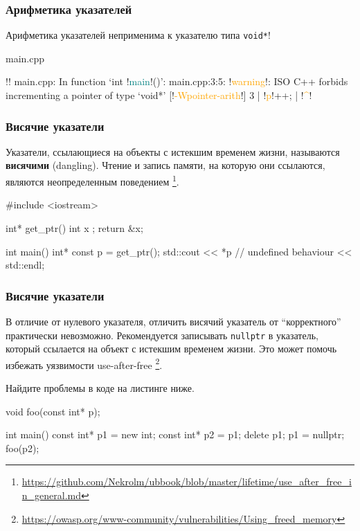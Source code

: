 \documentclass[compress, 8pt, aspectratio=169]{beamer}
\begin{document}
\begin{frame}[fragile]

    \frametitle{Арифметика указателей}

    Арифметика указателей неприменима к указателю типа \verb|void*|!

        {main.cpp}

    \begin{terminalwindow}
!!
main.cpp: In function ‘int !\textcolor{teal}{main}!()’:
main.cpp:3:5: !\textcolor{orange}{warning}!: ISO C++ forbids incrementing a pointer of type ‘void*’ [!\textcolor{orange}{-Wpointer-arith}!]
    3 |     !\textcolor{orange}{p}!++;
      |     !\textcolor{orange}{\^{}}!
    \end{terminalwindow}

\end{frame}

\begin{frame}[fragile]

    \frametitle{Висячие указатели}

    Указатели, ссылающиеся на объекты с истекшим временем жизни,
    называются \textbf{висячими} (dangling).
    Чтение и запись памяти, на которую они ссылаются, являются неопределенным
    поведением
    \footnote{\url{https://github.com/Nekrolm/ubbook/blob/master/lifetime/use\_after\_free\_in\_general.md}}.

    \begin{myinplacelisting}[minted language=cpp]
#include <iostream>

int* get_ptr() {
    int x {};
    return &x;
}

int main() {
    int* const p = get_ptr();
    std::cout << *p // undefined behaviour
        << std::endl;
}
    \end{myinplacelisting}

\end{frame}

\begin{frame}[fragile]

    \frametitle{Висячие указатели}

    В отличие от нулевого указателя, отличить висячий указатель от
    \enquote{корректного} практически невозможно.
    Рекомендуется записывать \verb|nullptr| в указатель, который ссылается
    на объект с истекшим временем жизни.
    Это может помочь избежать уязвимости use-after-free
    \footnote{\url{https://owasp.org/www-community/vulnerabilities/Using\_freed\_memory}}.

    \begin{task}
        Найдите проблемы в коде на листинге ниже.
    \end{task}

    \begin{myinplacelisting}[minted language=cpp]
void foo(const int* p);

int main() {
    const int* p1 = new int;
    const int* p2 = p1;
    delete p1;
    p1 = nullptr;
    foo(p2);
}
    \end{myinplacelisting}

\end{frame}
\end{document}
